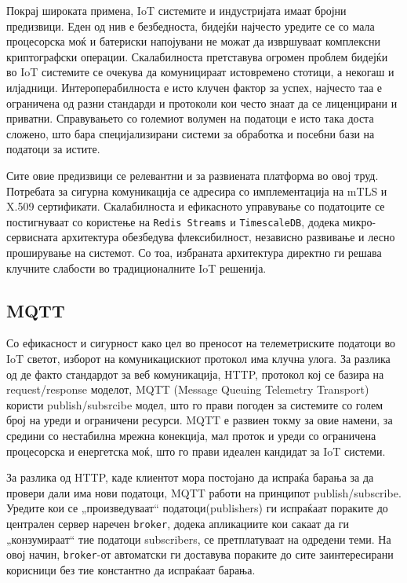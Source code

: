 Покрај широката примена, IoT системите и индустријата имаат бројни
предизвици. Еден од нив е безбедноста, бидејќи најчесто уредите се со
мала процесорска моќ и батериски напојувани не можат да извршуваат
комплексни криптографски операции. Скалабилноста претставува огромен
проблем бидејќи во IoT системите се очекува да комуницираат истовремено
стотици, а некогаш и илјадници. Интероперабилноста е исто клучен фактор
за успех, најчесто таа е ограничена од разни стандарди и протоколи кои
често знаат да се лиценцирани и приватни. Справувањето со големиот
волумен на податоци е исто така доста сложено, што бара специјализирани
системи за обработка и посебни бази на податоци за истите.

Сите овие предизвици се релевантни и за развиената платформа во овој
труд. Потребата за сигурна комуникација се адресира со имплементација на
mTLS и X.509 сертификати. Скалабилноста и ефикасното управување со
податоците се постигнуваат со користење на \texttt{Redis Streams} и \texttt{TimescaleDB},
додека микро-сервисната архитектура обезбедува флексибилност, независно
развивање и лесно проширување на системот. Со тоа, избраната архитектура
директно ги решава клучните слабости во традиционалните IoT решенија.

\subsection{MQTT}

Со ефикасност и сигурност како цел во преносот на телеметриските податоци
во IoT светот, изборот на комуникацискиот протокол има клучна улога. За
разлика од де факто стандардот за веб комуникација, HTTP, протокол кој
се базира на request/response моделот, MQTT (Message Queuing Telemetry
Transport) користи publish/subsrcibe модел, што го прави погоден за
системите со голем број на уреди и ограничени ресурси. MQTT е развиен
токму за овие намени, за средини со нестабилна мрежна конекција, мал
проток и уреди со ограничена процесорска и енергетска моќ, што го прави
идеален кандидат за IoT системи.

За разлика од HTTP, каде клиентот мора постојано да испраќа барања за да
провери дали има нови податоци, MQTT работи на принципот
publish/subscribe. Уредите кои се „произведуваат`` податоци(publishers)
ги испраќаат пораките до централен сервер наречен \texttt{broker}, додека
апликациите кои сакаат да ги „конзумираат`` тие податоци subscribers, се
претплатуваат на одредени теми. На овој начин, \texttt{broker}-от автоматски ги
доставува пораките до сите заинтересирани корисници без тие константно
да испраќаат барања.

